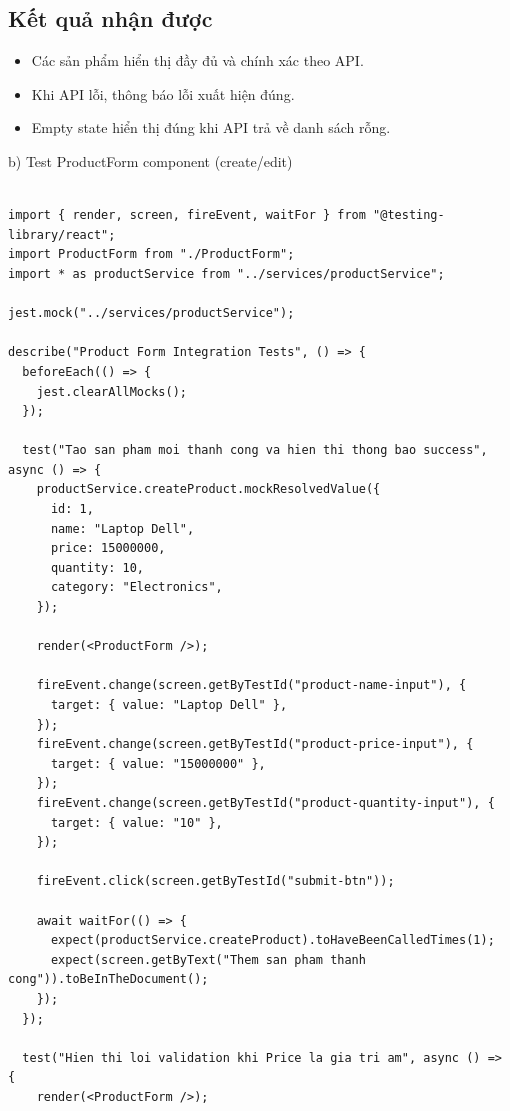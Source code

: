 \documentclass[a4paper,12pt]{article}
\begin{document}
\subsection*{Kết quả nhận được}
\begin{itemize}
    \item Các sản phẩm hiển thị đầy đủ và chính xác theo API.
    \item Khi API lỗi, thông báo lỗi xuất hiện đúng.
    \item Empty state hiển thị đúng khi API trả về danh sách rỗng.
\end{itemize}

b) Test ProductForm component (create/edit)
\begin{tcolorbox}[breakable, colback=green!5,colframe=black!50,title=Product Form Integration Test]
\begin{lstlisting}

import { render, screen, fireEvent, waitFor } from "@testing-library/react";
import ProductForm from "./ProductForm";
import * as productService from "../services/productService";

jest.mock("../services/productService");

describe("Product Form Integration Tests", () => {
  beforeEach(() => {
    jest.clearAllMocks();
  });

  test("Tao san pham moi thanh cong va hien thi thong bao success", async () => {
    productService.createProduct.mockResolvedValue({
      id: 1,
      name: "Laptop Dell",
      price: 15000000,
      quantity: 10,
      category: "Electronics",
    });

    render(<ProductForm />);

    fireEvent.change(screen.getByTestId("product-name-input"), {
      target: { value: "Laptop Dell" },
    });
    fireEvent.change(screen.getByTestId("product-price-input"), {
      target: { value: "15000000" },
    });
    fireEvent.change(screen.getByTestId("product-quantity-input"), {
      target: { value: "10" },
    });

    fireEvent.click(screen.getByTestId("submit-btn"));

    await waitFor(() => {
      expect(productService.createProduct).toHaveBeenCalledTimes(1);
      expect(screen.getByText("Them san pham thanh cong")).toBeInTheDocument();
    });
  });

  test("Hien thi loi validation khi Price la gia tri am", async () => {
    render(<ProductForm />);


\end{lstlisting}
\end{tcolorbox}
\end{document}
